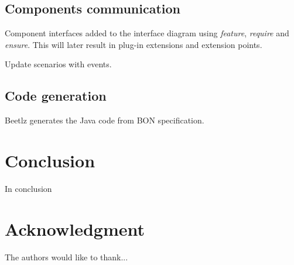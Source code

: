 \documentclass[conference]{IEEEtran}
\begin{document}
%
\subsection{Components communication}
Component interfaces added to the interface diagram using  \emph{feature}, \emph{require} and \emph{ensure}. This will later result in plug-in extensions and extension points.


Update scenarios with events.

%
\subsection{Code generation}
Beetlz generates the Java code from BON specification.

\section{Conclusion}
In conclusion





\section*{Acknowledgment}


The authors would like to thank...






%
%
%
%

\end{document}
